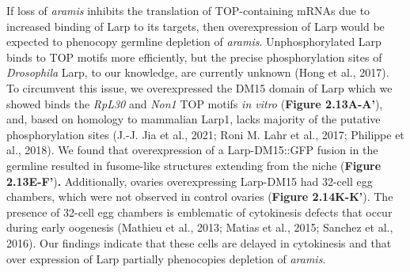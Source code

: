 \documentclass[12pt,oneside]{reedthesis}
\begin{document}
If loss of \emph{aramis} inhibits the translation of TOP-containing mRNAs due to increased binding of Larp to its targets, then overexpression of Larp would be expected to phenocopy germline depletion of \emph{aramis}. Unphosphorylated Larp binds to TOP motifs more efficiently, but the precise phosphorylation sites of \emph{Drosophila} Larp, to our knowledge, are currently unknown (Hong et al., 2017). To circumvent this issue, we overexpressed the DM15 domain of Larp which we showed binds the \emph{RpL30} and \emph{Non1} TOP motifs \emph{in vitro} (\textbf{Figure 2.13A-A'}), and, based on homology to mammalian Larp1, lacks majority of the putative phosphorylation sites (J.-J. Jia et al., 2021; Roni M. Lahr et al., 2017; Philippe et al., 2018). We found that overexpression of a Larp-DM15::GFP fusion in the germline resulted in fusome-like structures extending from the niche (\textbf{Figure 2.13E-F'})\textbf{.} Additionally, ovaries overexpressing Larp-DM15 had 32-cell egg chambers, which were not observed in control ovaries (\textbf{Figure 2.14K-K'}). The presence of 32-cell egg chambers is emblematic of cytokinesis defects that occur during early oogenesis (Mathieu et al., 2013; Matias et al., 2015; Sanchez et al., 2016). Our findings indicate that these cells are delayed in cytokinesis and that over expression of Larp partially phenocopies depletion of \emph{aramis}.
\end{document}
